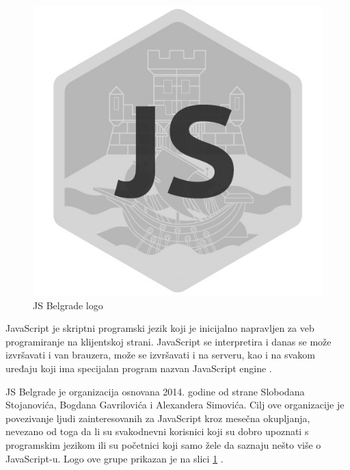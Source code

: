 \documentclass[a4paper]{article}
\begin{document}
{\begin{figure}[h!]
\begin{center}
\includegraphics[scale=0.25]{JS_logo.png}
\end{center}
\caption{JS Belgrade logo}
\label{fig:JS_slika}
\end{figure}

JavaScript je skriptni programski jezik koji je inicijalno napravljen za veb programiranje na klijentskoj strani. JavaScript se interpretira i danas se može izvršavati i van brauzera, može se izvršavati i na serveru, kao i na svakom uređaju koji ima specijalan program nazvan JavaScript engine \cite{aboutJS}. 

JS Belgrade je organizacija osnovana 2014. godine od strane Slobodana Stojanovića, Bogdana Gavrilovića i Alexandera Simovića. Cilj ove organizacije je povezivanje ljudi zainteresovanih za JavaScript kroz mesečna okupljanja, nevezano od toga da li su svakodnevni korisnici koji su dobro upoznati s programskim jezikom ili su početnici koji samo žele da saznaju nešto više o JavaScript-u. Logo ove grupe prikazan je na slici \ref{fig:JS_slika} \cite{JS_Belgrade_meetup_pocetna}.

}
\end{document}
